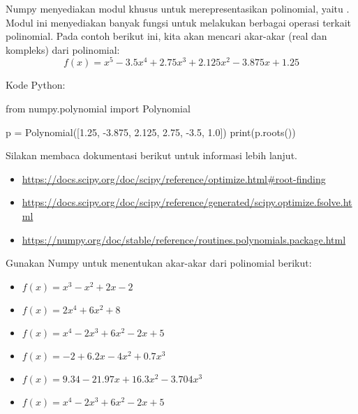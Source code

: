 Numpy menyediakan modul khusus untuk merepresentasikan polinomial, yaitu
. Modul ini menyediakan banyak fungsi untuk
melakukan berbagai operasi terkait polinomial.
Pada contoh berikut ini, kita akan mencari akar-akar (real dan kompleks)
dari polinomial:
\begin{equation*}
f(x) = x^5 - 3.5x^4 + 2.75x^3 + 2.125x^2 - 3.875x + 1.25
\end{equation*}

Kode Python:
\begin{pythoncode}
from numpy.polynomial import Polynomial

p = Polynomial([1.25, -3.875, 2.125, 2.75, -3.5, 1.0])
print(p.roots())
\end{pythoncode}

Silakan membaca dokumentasi berikut untuk informasi lebih lanjut.
\begin{itemize}
\item {\scriptsize\url{https://docs.scipy.org/doc/scipy/reference/optimize.html\#root-finding}}
\item {\scriptsize\url{https://docs.scipy.org/doc/scipy/reference/generated/scipy.optimize.fsolve.html}}
\item {\scriptsize\url{https://numpy.org/doc/stable/reference/routines.polynomials.package.html}}
\end{itemize}

\begin{soal}
Gunakan Numpy untuk menentukan akar-akar dari polinomial berikut:
\begin{itemize}
\item $f(x) = x^3 - x^2 + 2x - 2$
\item $f(x) = 2x^4 + 6x^2 + 8$
\item $f(x) = x^4 - 2x^3 + 6x^2 - 2x + 5$
\item $f(x) = -2 + 6.2x - 4x^2 + 0.7x^3$
\item $f(x) = 9.34 - 21.97x + 16.3x^2 - 3.704x^3$
\item $f(x) = x^4 - 2x^3 + 6x^2 - 2x + 5$
\end{itemize}
\end{soal}
